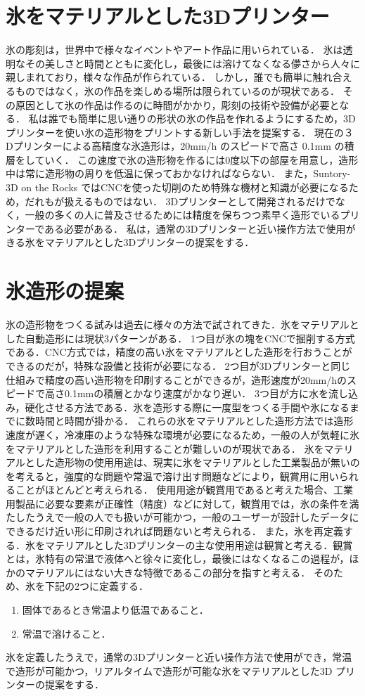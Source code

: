 \section{氷をマテリアルとした3Dプリンター}
\label{sec:paragraph}

氷の彫刻は，世界中で様々なイベントやアート作品に用いられている．
氷は透明なその美しさと時間とともに変化し，最後には溶けてなくなる儚さから人々に親しまれており，様々な作品が作られている．
しかし，誰でも簡単に触れ合えるものではなく，氷の作品を楽しめる場所は限られているのが現状である．
その原因として氷の作品は作るのに時間がかかり，彫刻の技術や設備が必要となる．
私は誰でも簡単に思い通りの形状の氷の作品を作れるようにするため，3Dプリンターを使い氷の造形物をプリントする新しい手法を提案する．
現在の３Dプリンターによる高精度な氷造形は，20mm/h のスピードで高さ 0.1mm の積層をしていく．
この速度で氷の造形物を作るには0度以下の部屋を用意し，造形中は常に造形物の周りを低温に保っておかなければならない．
また，Suntory-3D on the Rocks \cite{b} ではCNCを使った切削のため特殊な機材と知識が必要になるため，だれもが扱えるものではない．
3Dプリンターとして開発されるだけでなく，一般の多くの人に普及させるためには精度を保ちつつ素早く造形でいるプリンターである必要がある．
私は，通常の3Dプリンターと近い操作方法で使用がきる氷をマテリアルとした3Dプリンターの提案をする．

\section{氷造形の提案}
\label{sec:enum}

氷の造形物をつくる試みは過去に様々の方法で試されてきた．氷をマテリアルとした自動造形には現状3パターンがある．
1つ目が氷の塊をCNCで掘削する方式である．CNC方式では，精度の高い氷をマテリアルとした造形を行おうことができるのだが，特殊な設備と技術が必要になる．
2つ目が3Dプリンターと同じ仕組みで精度の高い造形物を印刷することができるが，造形速度が20mm/hのスピードで高さ0.1mmの積層とかなり速度がかなり遅い．
3つ目が方に水を流し込み，硬化させる方法である．氷を造形する際に一度型をつくる手間や氷になるまでに数時間と時間が掛かる．
これらの氷をマテリアルとした造形方法では造形速度が遅く，冷凍庫のような特殊な環境が必要になるため，一般の人が気軽に氷をマテリアルとした造形を利用することが難しいのが現状である．
氷をマテリアルとした造形物の使用用途は、現実に氷をマテリアルとした工業製品が無いのを考えると，強度的な問題や常温で溶け出す問題などにより，観賞用に用いられることがほとんどと考えられる．
使用用途が観賞用であると考えた場合、工業用製品に必要な要素が正確性（精度）などに対して，観賞用では，氷の条件を満たしたうえで一般の人でも扱いが可能かつ，一般のユーザーが設計したデータにできるだけ近い形に印刷されれば問題ないと考えられる．
また，氷を再定義する．氷をマテリアルとした3Dプリンターの主な使用用途は観賞と考える．観賞とは，氷特有の常温で液体へと徐々に変化し，最後にはなくなるこの過程が，ほかのマテリアルにはない大きな特徴であるこの部分を指すと考える．
そのため、氷を下記の2つに定義する．

\begin{enumerate}
  \item 固体であるとき常温より低温であること． 
  \item 常温で溶けること．
 \end{enumerate}

氷を定義したうえで，通常の3Dプリンターと近い操作方法で使用ができ，常温で造形が可能かつ，リアルタイムで造形が可能な氷をマテリアルとした3D プリンターの提案をする．

